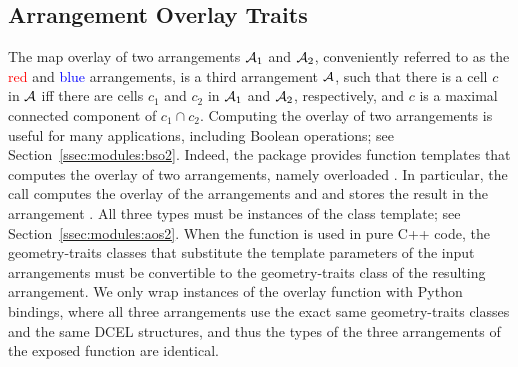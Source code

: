 \subsection{Arrangement Overlay Traits}
\label{sec:code:overlay}
The map overlay of two arrangements ${\cal A}_1$ and ${\cal A}_2$,
conveniently referred to as the \textcolor{red}{red} and
\textcolor{blue}{blue} arrangements, is a third arrangement ${\cal A}$,
such that there is a cell $c$ in ${\cal A}$ iff there are cells $c_1$ and
$c_2$ in ${\cal A}_1$ and ${\cal A}_2$, respectively, and $c$ is a
maximal connected component of $c_1 \cap c_2$.
Computing the overlay of two arrangements is useful for many
applications, including Boolean operations; see
Section~\ref{ssec:modules:bso2}. Indeed, the \iiDArrangementsPackage{}
package provides function templates that computes the overlay of two
arrangements, namely overloaded . In
particular, the call 
computes the overlay of the arrangements  and
 and stores the result in the arrangement
. All three types must be instances of the
 class template; see
Section~\ref{ssec:modules:aos2}. When the function is used in pure C++
code, the geometry-traits classes that substitute the
 template parameters of the input arrangements
must be convertible to the geometry-traits class of the resulting
arrangement. We only wrap instances of the overlay function with
Python bindings, where all three arrangements use the exact same
geometry-traits classes and the same DCEL structures, and thus the
types of the three arrangements of the exposed
 function are identical.

